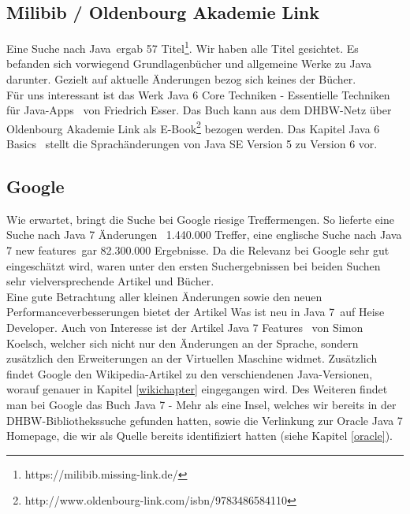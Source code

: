 \subsection{Milibib / Oldenbourg Akademie Link}
Eine Suche nach \glqq Java\grqq ~ergab 57 Titel\footnote{https://milibib.missing-link.de/}. Wir haben alle Titel gesichtet. Es befanden sich vorwiegend Grundlagenbücher und allgemeine Werke zu Java darunter. Gezielt auf aktuelle Änderungen bezog sich keines der Bücher.\\

Für uns interessant ist das Werk \glqq Java 6 Core Techniken - Essentielle Techniken für Java-Apps\grqq\cite{java6core} ~von Friedrich Esser. Das Buch kann aus dem DHBW-Netz über Oldenbourg Akademie Link als E-Book\footnote{http://www.oldenbourg-link.com/isbn/9783486584110} bezogen werden. Das Kapitel \glqq Java 6 Basics\grqq\cite{java6core} ~stellt die Sprachänderungen von Java SE Version 5 zu Version 6 vor.

\subsection{Google}
Wie erwartet, bringt die Suche bei Google riesige Treffermengen. So lieferte eine Suche nach \glqq Java 7 Änderungen\grqq~
1.440.000 Treffer, eine englische Suche nach \glqq Java 7 new features\grqq~gar 82.300.000 Ergebnisse. Da die Relevanz bei
Google sehr gut eingeschätzt wird, waren unter den ersten Suchergebnissen bei beiden Suchen sehr vielversprechende Artikel
und Bücher.\\

Eine gute Betrachtung aller kleinen Änderungen sowie den neuen Performanceverbesserungen bietet der Artikel
\glqq Was ist neu in Java 7\grqq\cite{heiseWasistNeu}~auf Heise Developer.
Auch von Interesse ist der Artikel \glqq Java 7 Features\grqq\cite{blogJava7Features} ~von Simon Koelsch, welcher sich nicht nur
den Änderungen an der Sprache, sondern zusätzlich den Erweiterungen an der Virtuellen Maschine widmet.
Zusätzlich findet Google den Wikipedia-Artikel zu den verschiendenen Java-Versionen, worauf genauer in Kapitel \ref{wikichapter} eingegangen wird.
Des Weiteren findet man bei Google das Buch \glqq Java 7 - Mehr als eine Insel\grqq\cite{javainsel2}, welches wir bereits in der
DHBW-Bibliothekssuche gefunden hatten, sowie die Verlinkung zur Oracle Java 7 Homepage, die wir als  Quelle bereits
identifiziert hatten (siehe Kapitel \ref{oracle}).\\

